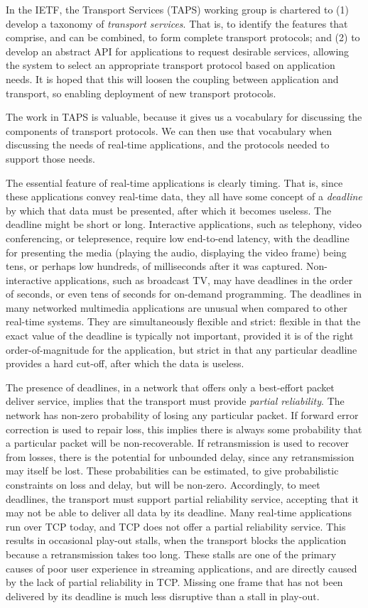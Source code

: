 \documentclass{sig-alternate-05-2015}
\begin{document}
In the IETF, the Transport Services (TAPS) working group is chartered to 
(1) develop a taxonomy of \emph{transport services}. That is, to identify the
features that comprise, and can be combined, to form complete transport
protocols; and (2) to develop an abstract API for applications to request
desirable services, allowing the system to select an appropriate transport
protocol based on application needs. It is hoped that this will loosen the
coupling between application and transport, so enabling deployment of new 
transport protocols.

The work in TAPS is valuable, because it gives us a vocabulary for
discussing the components of transport protocols.  We can then use that
vocabulary when discussing the needs of real-time applications, and the
protocols needed to support those needs.

The essential feature of real-time applications is clearly timing. That is,
since these applications convey real-time data, they all have some concept
of a \emph{deadline} by which that data must be presented, after which it
becomes useless. 
The deadline might be short or long. Interactive applications, such as
telephony, video conferencing, or telepresence, require low end-to-end
latency, with the deadline for presenting the media (playing the audio,
displaying the video frame) being tens, or perhaps low hundreds, of
milliseconds after it was captured. Non-interactive applications, such as
broadcast TV, may have deadlines in the order of seconds, or even tens of
seconds for on-demand programming. 
The deadlines in many networked multimedia applications are unusual when
compared to other real-time systems. They are simultaneously flexible and
strict: flexible in that the exact value of the deadline is typically not
important, provided it is of the right order-of-magnitude for the
application, but strict in that any particular deadline provides a hard
cut-off, after which the data is useless. 

The presence of deadlines, in a network that offers only a best-effort
packet deliver service, implies that the transport must provide
\emph{partial reliability}.
The network has non-zero probability of losing any particular packet. 
If forward error correction is used to repair loss, this implies there is
always some probability that a particular packet will be non-recoverable.
If retransmission is used to recover from losses, there is the potential 
for unbounded delay, since any retransmission may itself be lost. 
These probabilities can be estimated, to give probabilistic constraints
on loss and delay, but will be non-zero. Accordingly, to meet deadlines,
the transport must support partial reliability service, accepting that
it may not be able to deliver all data by its deadline.
Many real-time applications run over TCP today, and TCP does not offer a
partial reliability service. This results in occasional play-out stalls, 
when the transport blocks the application because a retransmission takes
too long. These stalls are one of the primary causes of poor user
experience in streaming applications, and are directly caused by the lack
of partial reliability in TCP. Missing one frame that has not been
delivered by its deadline is much less disruptive than a stall in play-out. 
\end{document}
